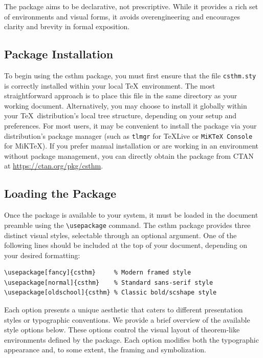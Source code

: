 \documentclass[10pt,letterpaper]{amsart}
\begin{document}
The package aims to be declarative, not prescriptive. While it provides a rich
set of environments and visual forms, it avoids overengineering and encourages
clarity and brevity in formal exposition.

\subsection{Package Installation}

To begin using the \textsf{csthm} package, you must first ensure that the file
\texttt{csthm.sty} is correctly installed within your local \TeX\ environment.
The most straightforward approach is to place this file in the same directory
as your working document. Alternatively, you may choose to install it globally
within your \TeX\ distribution's local tree structure, depending on your setup
and preferences. For most users, it may be convenient to install the package
via your distribution's package manager (such as \texttt{tlmgr} for \TeX Live
or \texttt{MiK\TeX\ Console} for MiK\TeX). If you prefer manual installation or
are working in an environment without package management, you can directly
obtain the package from CTAN at \url{https://ctan.org/pkg/csthm}.

\subsection{Loading the Package}

Once the package is available to your system, it must be loaded in the document
preamble using the \verb|\usepackage| command. The \textsf{csthm} package
provides three distinct visual styles, selectable through an optional argument.
One of the following lines should be included at the top of your document,
depending on your desired formatting:

\begin{verbatim}
\usepackage[fancy]{csthm}     % Modern framed style
\usepackage[normal]{csthm}    % Standard sans-serif style
\usepackage[oldschool]{csthm} % Classic bold/scshape style
\end{verbatim}

Each option presents a unique aesthetic that caters to different presentation
styles or typographic conventions. We provide a brief overview of the available
style options below. These options control the visual layout of theorem-like
environments defined by the package. Each option modifies both the typographic
appearance and, to some extent, the framing and symbolization.
\end{document}
